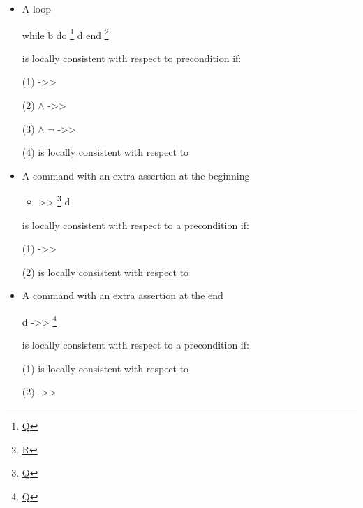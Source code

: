 \documentclass[12pt]{report}
\begin{document}
\begin{itemize}
\item  A loop


        while b do \footnote{\url{Q}} d end \footnote{\url{R}}


      is locally consistent with respect to precondition  if:


         (1)  ->>  


         (2)   \ensuremath{\land}  ->> 


         (3)   \ensuremath{\land} \ensuremath{\lnot} ->> 


         (4)  is locally consistent with respect to 

\end{itemize}



\begin{itemize}
\item  A command with an extra assertion at the beginning



\begin{itemize}
\item >> \footnote{\url{Q}} d



\end{itemize}
      is locally consistent with respect to a precondition  if:


        (1)  ->> 


        (2)  is locally consistent with respect to 

\end{itemize}



\begin{itemize}
\item  A command with an extra assertion at the end


         d ->> \footnote{\url{Q}}


      is locally consistent with respect to a precondition  if:


        (1)  is locally consistent with respect to 


        (2)   ->> 

\end{itemize}
\end{document}
